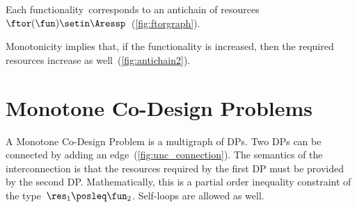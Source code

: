 
\noindent Each functionality~\fun corresponds to an antichain
of resources $\ftor(\fun)\setin\Aressp$~(\cref{fig:ftorgraph}).


\noindent Monotonicity implies that, if the functionality is increased,
then the required resources increase as well~(\cref{fig:antichain2}).


\section{Monotone Co-Design Problems }

A Monotone Co-Design Problem is a multigraph of DPs.
Two DPs can be
connected by adding an edge~(\cref{fig:unc_connection}).
The semantics
of the interconnection is that the resources required by the first
DP must be provided by the second DP.
Mathematically, this is a partial
order inequality constraint of the type~$\res_{1}\posleq\fun_{2}$.
Self-loops are allowed as well.

